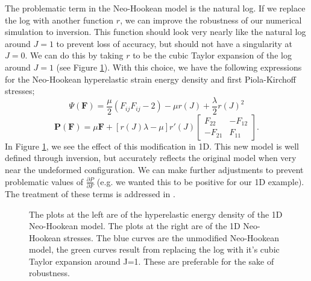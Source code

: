 The problematic term in the Neo-Hookean model is the natural log. If we replace the log with another function $r$, we can improve the robustness of our numerical simulation to inversion. This function should look very nearly like the natural log around $J=1$ to prevent loss of accuracy, but should not have a singularity at $J=0$. We can do this by taking $r$ to be the cubic Taylor expansion of the log around $J=1$ (see Figure \ref{inversion3}). With this choice, we have the following expressions for the Neo-Hookean hyperelastic strain energy density and first Piola-Kirchoff stresses;
$$
\Psi(\mathbf{F})=\frac{\mu}{2}(F_{ij}F_{ij}-2)-\mu{r}(J)+\frac{\lambda}{2}r(J)^2
$$
$$
\mathbf{P}(\mathbf{F})=\mu\mathbf{F}+\left[r(J)\lambda-\mu\right]r'(J)\left[\begin{array}{cc}
F_{22} & -F_{12}\\
-F_{21} & F_{11} \end{array}\right].
$$
In Figure \ref{inversion3}, we see the effect of this modification in 1D. This new model is well defined through inversion, but accurately reflects the original model when very near the undeformed configuration. We can make further adjustments to prevent problematic values of $\frac{\partial P}{\partial F}$ (e.g. we wanted this to be positive for our 1D example). The treatment of these terms is addressed in \cite{TeranQuas05}.
\begin{figure}
\caption{The plots at the left are of the hyperelastic energy density of the 1D Neo-Hookean model. The plots at the right are of the 1D Neo-Hookean stresses. The blue curves are the unmodified Neo-Hookean model, the green curves result from replacing the log with it's cubic Taylor expansion around J=1. These are preferable for the sake of robustness.}
\label{inversion3}
\end{figure}
